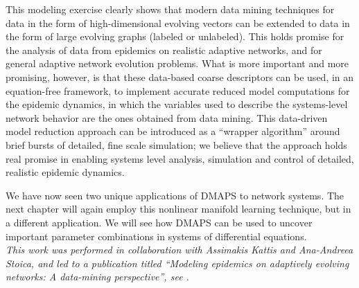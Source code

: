 This modeling exercise clearly shows that modern data mining
techniques for data in the form of high-dimensional evolving vectors
can be extended to data in the form of large evolving graphs (labeled
or unlabeled). This holds promise for the analysis of data from
epidemics on realistic adaptive networks, and for general adaptive
network evolution problems. What is more important and more promising,
however, is that these data-based coarse descriptors can be used, in
an equation-free framework, to implement accurate reduced model
computations for the epidemic dynamics, in which the variables used to
describe the systems-level network behavior are the ones obtained from
data mining. This data-driven model reduction approach can be
introduced as a “wrapper algorithm” around brief bursts of detailed,
fine scale simulation; we believe that the approach holds real promise
in enabling systems level analysis, simulation and control of
detailed, realistic epidemic dynamics.

We have now seen two unique applications of DMAPS to network
systems. The next chapter will again employ this nonlinear manifold
learning technique, but in a different application. We will see how
DMAPS can be used to uncover important parameter combinations in
systems of differential equations. \\


\textit{This work was performed in collaboration with Assimakis Kattis
  and Ana-Andreea Stoica, and led to a publication titled ``Modeling
  epidemics on adaptively evolving networks: A data-mining
  perspective'', see \cite{kattis_modeling_2016}.}


